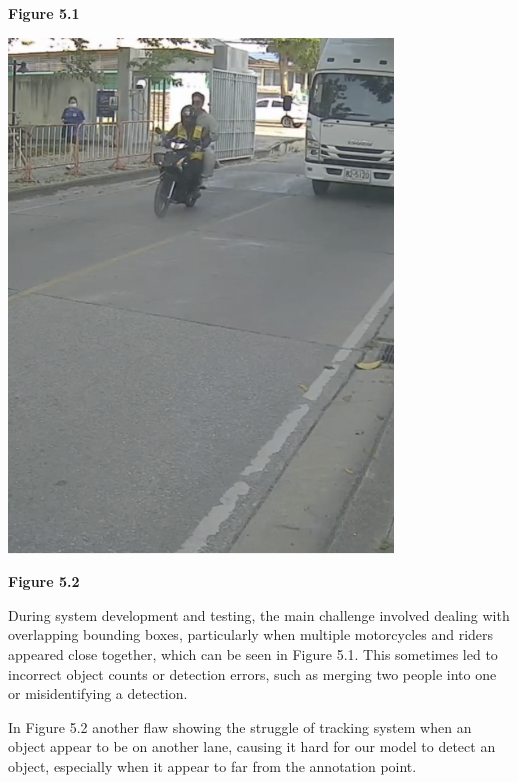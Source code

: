 \begin{center}
\begin{minipage}{0.45\textwidth}
		\textbf{Figure 5.1}
	\end{minipage}
	\hfill
	\begin{minipage}{0.45\textwidth}
		\centering
		\includegraphics[width=\linewidth]{limitation3.png}
		\vspace{0.5em} %
		
		\textbf{Figure 5.2}
	\end{minipage}
\end{center}
\setlength{\parindent}{2.5em}
During system development and testing, the main challenge involved dealing with overlapping bounding boxes, particularly when multiple motorcycles and riders appeared close together, which can be seen in Figure 5.1. This sometimes led to incorrect object counts or detection errors, such as merging two people into one or misidentifying a detection. 

In Figure 5.2 another flaw showing the struggle of tracking system when an object appear to be on another lane, causing it hard for our model to detect an object, especially when it appear to far from the annotation point.


